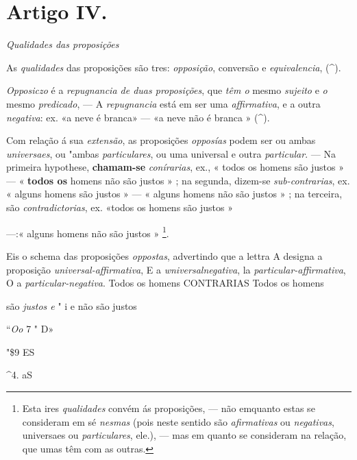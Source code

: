 
\section*{Artigo IV.}

 \emph{Qualidades das proposições}


As \emph{qualidades} das proposições são tres: \emph{opposição}, conversão e \emph{equivalencia}, (\textasciicircum{}).


\emph{Opposiczo} é a \emph{repugnancia de duas proposições}, que \emph{têm o} mesmo \emph{sujeito} e \emph{o} mesmo \emph{predicado}, --- A \emph{repugnancia} está em ser uma \emph{affirmativa}, e a outra \emph{negativa}: ex. «a neve é branca» --- «a neve não é branca » (\textasciicircum{}).


Com relação á sua \emph{extensão}, as proposições \emph{opposías} podem ser ou ambas \emph{universaes}, ou "ambas \emph{particulares}, ou uma universal e outra \emph{particular}. --- Na primeira hypothese, \textbf{chamam-se} \emph{conírarias}, ex., « todos os homens são justos » --- « \textbf{todos os} homens não são justos » ; na segunda, dizem-se \emph{sub-contrarias}, ex. « alguns homens são justos » --- « alguns homens não são justos » ; na terceira, são \emph{contradictorias}, ex. «todos os homens são justos »

---:« alguns homens não são justos » \footnote{Esta ires \emph{qualidades} convém ás proposições, --- não emquanto estas se consideram em sé \emph{nesmas} (pois neste sentido são \emph{afirmativas} ou \emph{negativas}, universaes ou \emph{particulares}, ele.), --- mas em quanto se consideram na relação, que umas têm com as outras.}.

Eis o schema das proposições \emph{oppostas}, advertindo que a lettra A designa a proposição \emph{universal-affirmativa}, E a \emph{wniversalnegativa}, la \emph{particular-affirmativa}, O a \emph{particular-negativa}. Todos os homens CONTRARIAS Todos os homens

são \emph{justos e} " i e não são justos

“\emph{Oo} 7 " D»

"\$9 ES

\textasciicircum{}4. aS

